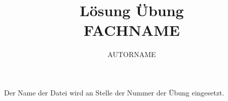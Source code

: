 \documentclass[11pt]{article}
\author{AUTORNAME}
\title{\vspace{-1.5cm}Lösung Übung \jobname \\ FACHNAME}
\begin{document}
\maketitle
\vspace{-1cm}

Der Name der Datei wird an Stelle der Nummer der Übung eingesetzt.

\section{}
\section{}
\section{}
\end{document}

